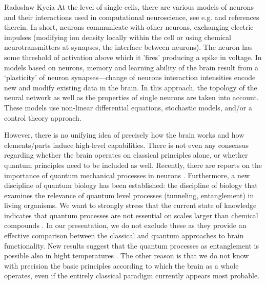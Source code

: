 \begin{artengenv}{Radosław Kycia}
At the level of single cells, there are various models of neurons and their interactions used in computational neuroscience, see e.g. \parencite{ModellingNeurons} and references therein. In short, neurons communicate with other neurons, exchanging electric impulses (modifying ion density locally within the cell or using chemical neurotransmitters at synapses, the interface between neurons). The neuron has some threshold of activation above which it 'fires' producing a spike in voltage. In models based on neurons, memory and learning ability of the brain result from a `plasticity' of neuron synapses---change of neurons interaction intensities encode new and modify existing data in the brain. In this approach, the topology of the neural network as well as the properties of single neurons are taken into account. These models use non-linear differential equations, stochastic models, and/or a control theory approach.

However, there is no unifying idea of precisely how the brain works and how elements/parts induce high-level capabilities. There is not even any consensus regarding whether the brain operates on classical principles alone, or whether quantum principles need to be included as well. Recently, there are reports on the importance of quantum mechanical processes in neurons  \parencite{EmperorsNewMind, PenroseQuantum1, PenroseQuantum2}. Furthermore, a new discipline of quantum biology \parencite{QuantumBilogy} has been established: the discipline of biology that examines the relevance of quantum level processes (tunneling, entanglement) in living organisms. We want to strongly stress that the current state of knowledge indicates that quantum processes are not essential on scales larger than chemical compounds \parencite{QuantumBilogy}. In our presentation, we do not exclude these as they provide an effective comparison between the classical and quantum approaches to brain functionality. New results suggest that the quantum processes as entanglement is possible also in hight temperatures \parencite{HightTempEntantgelemnt}. The other reason is that we do not know with precision the basic principles according to which the brain as a whole operates, even if the entirely classical paradigm currently appears most probable.



\end{artengenv}
